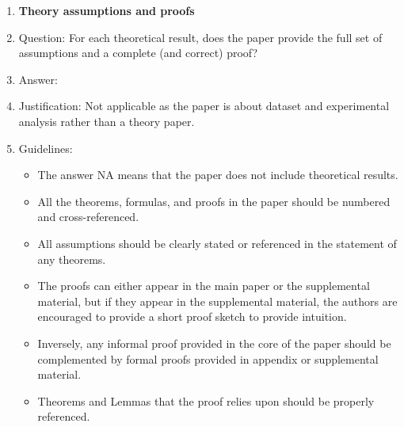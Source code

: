 \begin{enumerate}
\item {\bf Theory assumptions and proofs}
    \item[] Question: For each theoretical result, does the paper provide the full set of assumptions and a complete (and correct) proof?
    \item[] Answer: \answerNA{} %
    \item[] Justification: Not applicable as the paper is about dataset and experimental analysis rather than a theory paper. %
    \item[] Guidelines:
    \begin{itemize}
        \item The answer NA means that the paper does not include theoretical results. 
        \item All the theorems, formulas, and proofs in the paper should be numbered and cross-referenced.
        \item All assumptions should be clearly stated or referenced in the statement of any theorems.
        \item The proofs can either appear in the main paper or the supplemental material, but if they appear in the supplemental material, the authors are encouraged to provide a short proof sketch to provide intuition. 
        \item Inversely, any informal proof provided in the core of the paper should be complemented by formal proofs provided in appendix or supplemental material.
        \item Theorems and Lemmas that the proof relies upon should be properly referenced. 
    \end{itemize}


\end{enumerate}
